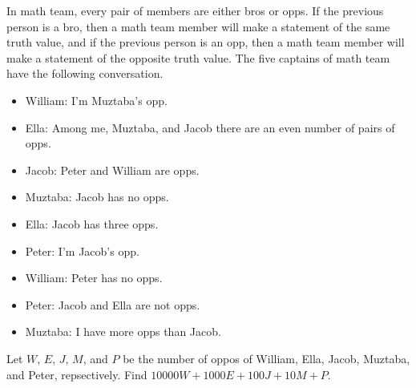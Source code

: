 In math team, every pair of members are either bros or opps. If the previous person is a bro, then a math team member will make a statement of the same truth value, and if the previous person is an opp, then a math team member will make a statement of the opposite truth value. The five captains of math team have the following conversation.

\begin{itemize}

\item William: I'm Muztaba's opp.

\item Ella: Among me, Muztaba, and Jacob there are an even number of pairs of opps.

\item Jacob: Peter and William are opps.

\item Muztaba: Jacob has no opps.

\item Ella: Jacob has three opps.

\item Peter: I'm Jacob's opp.

\item William: Peter has no opps.

\item Peter: Jacob and Ella are not opps.

\item Muztaba: I have more opps than Jacob.

\end{itemize}

Let $W$, $E$, $J$, $M$, and $P$ be the number of oppos of William, Ella, Jacob, Muztaba, and Peter, repsectively. Find $10000W+1000E+100J+10M+P.$
